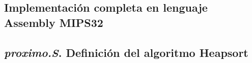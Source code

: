 \documentclass[9pt,a4paper]{article}
\begin{document}
\begin{appendices}
\section{Implementación completa en lenguaje Assembly MIPS32}

\subsection{\textit{proximo.S}. Definición del algoritmo Heapsort}
\lstset{ language = [mips]Assembler} %
 
\bigskip\bigskip

\end{appendices}
\end{document}
